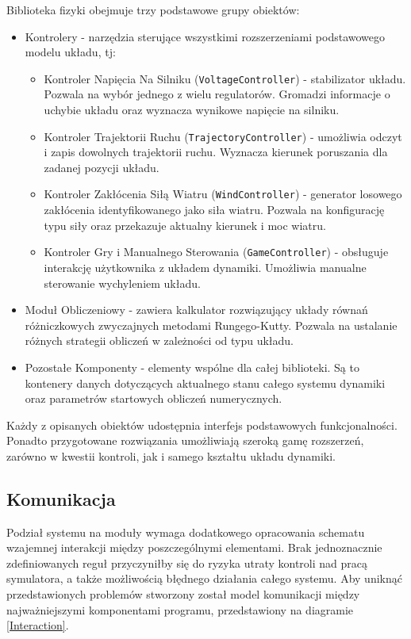 \documentclass[12pt, twoside, openany]{report}
\theoremstyle{definition}
\begin{document}
Biblioteka fizyki obejmuje trzy podstawowe grupy obiektów:
\begin{itemize}
\item Kontrolery - narzędzia sterujące wszystkimi rozszerzeniami podstawowego modelu układu, tj:
\begin{itemize}
\item Kontroler Napięcia Na Silniku (\texttt{VoltageController}) - stabilizator układu. Pozwala na wybór jednego z wielu regulatorów. Gromadzi informacje o uchybie układu oraz wyznacza wynikowe napięcie na silniku.
\item Kontroler Trajektorii Ruchu (\texttt{TrajectoryController}) - umożliwia odczyt i zapis dowolnych trajektorii ruchu. Wyznacza kierunek poruszania dla zadanej pozycji układu.
\item Kontroler Zakłócenia Siłą Wiatru (\texttt{WindController}) - generator losowego zakłócenia identyfikowanego jako siła wiatru. Pozwala na konfigurację typu siły oraz przekazuje aktualny kierunek i moc wiatru.
\item Kontroler Gry i Manualnego Sterowania (\texttt{GameController}) - obsługuje interakcję użytkownika z układem dynamiki. Umożliwia manualne sterowanie wychyleniem układu.
\end{itemize}
\item Moduł Obliczeniowy - zawiera kalkulator rozwiązujący układy równań różniczkowych zwyczajnych metodami Rungego-Kutty. Pozwala na ustalanie różnych strategii obliczeń w zależności od typu układu.
\item Pozostałe Komponenty - elementy wspólne dla całej biblioteki. Są to kontenery danych dotyczących aktualnego stanu całego systemu dynamiki oraz parametrów startowych obliczeń numerycznych. 
\end{itemize}

Każdy z opisanych obiektów udostępnia interfejs podstawowych funkcjonalności. Ponadto przygotowane rozwiązania umożliwiają szeroką gamę rozszerzeń, zarówno w kwestii kontroli, jak i samego kształtu układu dynamiki.

\subsection{Komunikacja}
Podział systemu na moduły wymaga dodatkowego opracowania schematu wzajemnej interakcji między poszczególnymi elementami. Brak jednoznacznie zdefiniowanych reguł przyczyniłby się do ryzyka utraty kontroli nad pracą symulatora, a także możliwością błędnego działania całego systemu. Aby uniknąć przedstawionych problemów stworzony został model komunikacji między najważniejszymi komponentami programu, przedstawiony na diagramie \ref{Interaction}.
\end{document}

